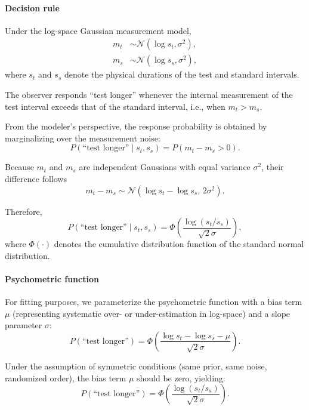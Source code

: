 \documentclass[9pt,lineno,doublespacing]{elife}
\begin{document}
\paragraph{Decision rule}

Under the log-space Gaussian measurement model,
\begin{align}
m_t &\sim \mathcal{N}(\log s_t, \sigma^2), \\
m_s &\sim \mathcal{N}(\log s_s, \sigma^2),
\end{align}
where $s_t$ and $s_s$ denote the physical durations of the test and standard intervals.

The observer responds ``test longer'' whenever the internal measurement of the test interval exceeds that of the standard interval, i.e., when $m_t > m_s$.

From the modeler's perspective, the response probability is obtained by marginalizing over the measurement noise:
\begin{equation}
P(\text{``test longer''} \mid s_t, s_s)
=
P(m_t - m_s > 0).
\end{equation}

Because $m_t$ and $m_s$ are independent Gaussians with equal variance $\sigma^2$, their difference follows
\begin{equation}
m_t - m_s
\sim
\mathcal{N}\!\left(
\log s_t - \log s_s,
\, 2\sigma^2
\right).
\end{equation}

Therefore,
\begin{equation}
P(\text{``test longer''} \mid s_t, s_s)
=
\Phi\!\left(
\frac{\log(s_t/s_s)}{\sqrt{2}\sigma}
\right),
\end{equation}
where $\Phi(\cdot)$ denotes the cumulative distribution function of the standard normal distribution.


\paragraph{Psychometric function}
For fitting purposes, we parameterize the psychometric function with a bias term $\mu$ (representing systematic over- or under-estimation in log-space) and a slope parameter $\sigma$:
\begin{equation}
P(\text{``test longer''}) = \Phi\left( \frac{\log s_t - \log s_s - \mu}{\sqrt{2}\sigma} \right).
\end{equation}


Under the assumption of symmetric conditions (same prior, same noise, randomized order), the bias term $\mu$ should be zero, yielding:
\begin{equation}
P(\text{``test longer''}) = \Phi\left( \frac{\log(s_t/s_s)}{\sqrt{2}\sigma} \right).
\end{equation}
\end{document}
